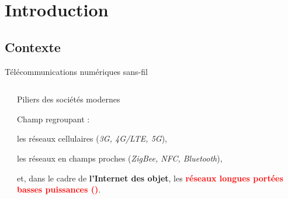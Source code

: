 \documentclass[../main.tex]{subfiles}
\begin{document}
\section{Introduction}

\subsection{Contexte}

\begin{frame}{Télécommunications numériques sans-fil}
  \begin{columns}
    \begin{column}{.4\linewidth}
      \begin{center}
      \end{center}
    \end{column}
    \begin{column}{.55\linewidth} \large
      \begin{overlayarea}{\linewidth}{.6\textheight}
        \begin{ctrlitemize}{1em}
          \item Piliers des sociétés modernes
          \item Champ regroupant :
          \begin{ctrlitemize}{1em}
            \item les réseaux cellulaires (\textit{3G, 4G/LTE, 5G}),
            \item les réseaux en champs proches (\textit{ZigBee, NFC, Bluetooth}),
            \item et, dans le cadre de \textbf{l'Internet des objet}, les \textbf{\textcolor{red}{réseaux longues portées basses puissances ()}}.
          \end{ctrlitemize}
        \end{ctrlitemize}
      \end{overlayarea}
    \end{column}
  \end{columns}
\end{frame}
\end{document}
